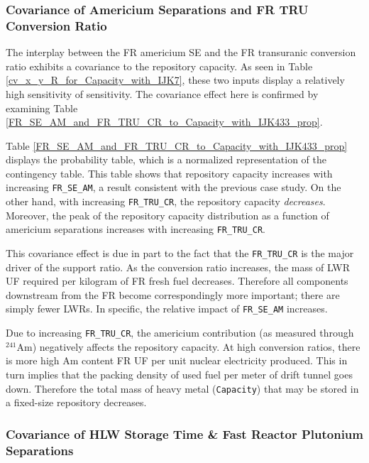\documentclass[preprint,12pt]{elsarticle}
\newcommand{\superscript}[1]{\ensuremath{^{\textrm{#1}}}}
\newcommand{\nuc}[2]{\superscript{#2}{#1}}
\begin{document}
\subsubsection{Covariance of Americium Separations and FR TRU Conversion Ratio}
\label{sec:am_se_fr_tru_cr}

The interplay between the FR americium SE and the FR transuranic conversion ratio exhibits a covariance
to the repository capacity.  As seen in Table \ref{cv_x_y_R_for_Capacity_with_IJK7}, these two inputs display a relatively high sensitivity of sensitivity.  The covariance effect here is confirmed by examining Table \ref{FR_SE_AM_and_FR_TRU_CR_to_Capacity_with_IJK433_prop}.

%


Table \ref{FR_SE_AM_and_FR_TRU_CR_to_Capacity_with_IJK433_prop} displays the probability table, which is a normalized representation of the contingency table.
This table shows that repository capacity increases with increasing \texttt{FR\_SE\_AM}, a result consistent
with the previous case study.  On the other hand, with increasing \texttt{FR\_TRU\_CR}, the repository capacity \emph{decreases}.  Moreover, the
peak of the repository capacity distribution as a function
of americium separations increases with increasing \texttt{FR\_TRU\_CR}.

This covariance effect is due in part to the fact that the \texttt{FR\_TRU\_CR} is the major driver of the support ratio.  As the conversion ratio
increases, the mass of LWR UF required per kilogram of FR fresh fuel decreases.  Therefore all components downstream from the FR become correspondingly more important;
there are simply fewer LWRs.  In specific, the relative impact of \texttt{FR\_SE\_AM} increases.

Due to increasing \texttt{FR\_TRU\_CR}, the americium contribution (as measured through \nuc{Am}{241}) negatively affects the repository capacity.  At high conversion ratios, there is more high Am content FR UF per unit nuclear electricity produced.  This in turn implies that the
packing density of used fuel per meter of drift tunnel goes down.  Therefore the total mass of heavy metal (\texttt{Capacity}) that may be stored in a
fixed-size repository decreases.


\subsubsection{Covariance of HLW Storage Time \& Fast Reactor Plutonium Separations}
\label{sec:hlw_pu_covariance}
\end{document}

